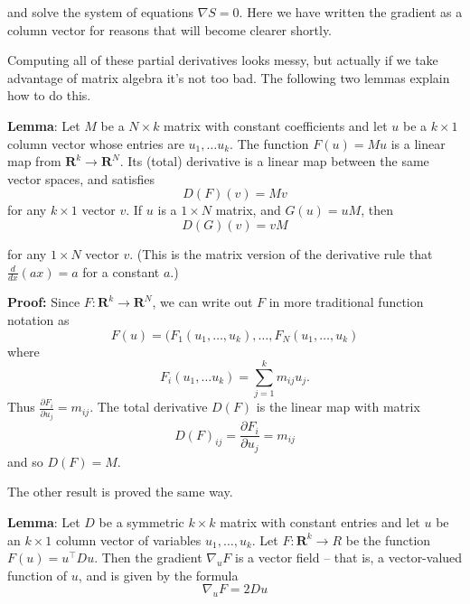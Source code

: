 \documentclass[
  oneside]{scrbook}
\begin{document}
and solve the system of equations \(\nabla S=0\). Here we have written
the gradient as a column vector for reasons that will become clearer
shortly.

Computing all of these partial derivatives looks messy, but actually if
we take advantage of matrix algebra it's not too bad. The following two
lemmas explain how to do this.

\textbf{Lemma}: Let \(M\) be a \(N\times k\) matrix with constant
coefficients and let \(u\) be a \(k\times 1\) column vector whose
entries are \(u_1,\ldots u_{k}\). The function \(F(u) = Mu\) is a linear
map from \(\mathbf{R}^{k}\to\mathbf{R}^{N}\). Its (total) derivative is
a linear map between the same vector spaces, and satisfies \[
D(F)(v) = Mv
\] for any \(k\times 1\) vector \(v\). If \(u\) is a \(1\times N\)
matrix, and \(G(u) = uM\), then \[
D(G)(v) = vM
\]

for any \(1\times N\) vector \(v\). (This is the matrix version of the
derivative rule that \(\frac{d}{dx}(ax)=a\) for a constant \(a\).)

\textbf{Proof:} Since \(F:\mathbf{R}^{k}\to\mathbf{R}^{N}\), we can
write out \(F\) in more traditional function notation as \[
F(u) = (F_{1}(u_1,\ldots, u_k), \ldots, F_{N}(u_1,\ldots, u_{k})
\] where \[
F_{i}(u_1,\ldots u_k) = \sum_{j=1}^{k} m_{ij}u_{j}.
\] Thus \(\frac{\partial F_{i}}{\partial u_{j}} = m_{ij}\). The total
derivative \(D(F)\) is the linear map with matrix \[
D(F)_{ij} = \frac{\partial F_{i}}{\partial u_{j}} = m_{ij}
\] and so \(D(F)=M\).

The other result is proved the same way.

\textbf{Lemma}: Let \(D\) be a symmetric \(k\times k\) matrix with
constant entries and let \(u\) be an \(k\times 1\) column vector of
variables \(u_{1},\ldots, u_{k}\). Let \(F:\mathbf{R}^{k}\to R\) be the
function \(F(u) = u^{\intercal}Du\). Then the gradient \(\nabla_{u} F\)
is a vector field -- that is, a vector-valued function of \(u\), and is
given by the formula \[
\nabla_{u} F = 2Du
\]
\end{document}
